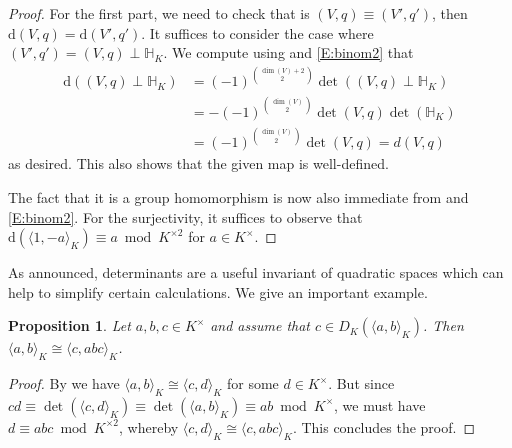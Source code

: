 \documentclass[12pt, leqno, british]{amsart}
\theoremstyle{definition}
\theoremstyle{plain}
\newtheorem{prop}[defi]{Proposition}
\theoremstyle{remark}
\newcommand{\mbb}{\mathbb}
\newcommand{\disc}{\mathrm{d}}
\begin{document}
\begin{proof}
For the first part, we need to check that is $(V, q) \equiv (V', q')$, then $\disc(V, q) = \disc(V', q')$.
It suffices to consider the case where $(V', q') = (V, q) \perp \mbb{H}_K$.
We compute using  and \cref{E:binom2} that
\begin{align*}
\disc((V, q) \perp \mbb{H}_K) &= (-1)^{\binom{\dim(V)+2}{2}}\det((V, q) \perp \mbb{H}_K ) \\
&= - (-1)^{\binom{\dim(V)}{2}} \det(V, q) \det(\mbb{H}_K) \\
&= (-1)^{\binom{\dim(V)}{2}} \det(V, q) = d(V, q)
\end{align*}
as desired.
This also shows that the given map is well-defined.

The fact that it is a group homomorphism is now also immediate from  and \cref{E:binom2}.
For the surjectivity, it suffices to observe that $\disc(\langle 1, -a \rangle_K) \equiv a \bmod K^{\times 2}$ for $a \in K^\times$.
\end{proof}
As announced, determinants are a useful invariant of quadratic spaces which can help to simplify certain calculations.
We give an important example.
\begin{prop}\label{P:binary-form-determinant}
Let $a, b, c \in K^\times$ and assume that $c \in D_K(\langle a, b \rangle_K)$.
Then $\langle a, b \rangle_K \cong \langle c, abc \rangle_K$.
\end{prop}
\begin{proof}
By  we have $\langle a, b \rangle_K \cong \langle c, d \rangle_K$ for some $d \in K^\times$.
But since $cd \equiv \det(\langle c, d \rangle_K) \equiv \det(\langle a, b \rangle_K) \equiv ab \bmod K^\times$, we must have $d \equiv abc \bmod K^{\times 2}$, whereby $\langle c, d \rangle_K \cong \langle c, abc \rangle_K$.
This concludes the proof.
\end{proof}
\end{document}
